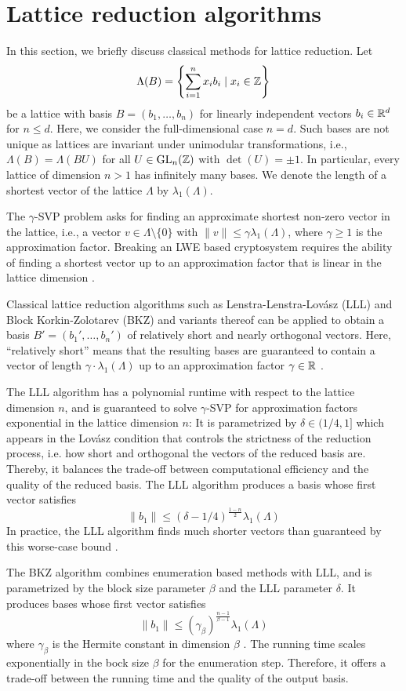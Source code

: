 \section{Lattice reduction algorithms}

In this section, we briefly discuss classical methods for lattice reduction. Let $$\Lambda(B)=\left\{\sum_{i=1}^nx_ib_i\mid x_i\in\mathbb Z\right\}$$ be a lattice with basis $B=(b_1,\dotsc,b_n)$ for linearly independent vectors $b_i\in\mathbb R^d$ for $n\leq d$. Here, we consider the full-dimensional case $n=d$. Such bases are not unique as lattices are invariant under unimodular transformations, i.e., $\Lambda(B)=\Lambda(BU)$ for all $U\in\mathrm{GL}_n(\mathbb Z)$ with $\det(U)=\pm1$. In particular, every lattice of dimension $n>1$ has infinitely many bases. We denote the length of a shortest vector of the lattice $\Lambda$ by $\lambda_1(\Lambda)$.

The $\gamma$-SVP problem asks for finding an approximate shortest non-zero vector in the lattice, i.e., a vector $v\in\Lambda\setminus\{0\}$ with $\|v\|\leq\gamma\lambda_1(\Lambda)$, where $\gamma\geq1$ is the approximation factor. Breaking an LWE based cryptosystem requires the ability of finding a shortest vector up to an approximation factor that is linear in the lattice dimension \cite{Peikert16}. 

Classical lattice reduction algorithms such as Lenstra-Lenstra-Lovász (LLL) \cite{LLL82} and Block Korkin-Zolotarev (BKZ) \cite{Schnorr94} and variants thereof can be applied to obtain a basis $B'=(b_1',\dotsc,b_n')$ of relatively short and nearly orthogonal vectors. Here, ``relatively short'' means that the resulting bases are guaranteed to contain a vector of length $\gamma\cdot\lambda_1(\Lambda)$ up to an approximation factor $\gamma\in\mathbb R$ \cite{Schneider10}.

The LLL algorithm \cite{LLL82} has a polynomial runtime with respect to the lattice dimension $n$, and is guaranteed to solve $\gamma$-SVP for approximation factors exponential in the lattice dimension $n$: It is parametrized by $\delta\in(1/4,1]$ which appears in the Lovász condition that controls the strictness of the reduction process, i.e. how short and orthogonal the vectors of the reduced basis are. Thereby, it balances the trade-off between computational efficiency and the quality of the reduced basis.
The LLL algorithm produces a basis whose first vector satisfies
$$ \|b_1\|\leq (\delta-1/4)^{\frac{1-n}{2}}\lambda_1(\Lambda) $$
In practice, the LLL algorithm finds much shorter vectors than guaranteed by this worse-case bound \cite{Schnorr94}.

The BKZ algorithm \cite{Schnorr94} combines enumeration based methods with LLL, and is parametrized by the block size parameter $\beta$ and the LLL parameter $\delta$. It produces bases whose first vector satisfies 
$$ \|b_1\|\leq (\gamma_{\beta})^{\frac{n-1}{\beta-1}}\lambda_1(\Lambda) $$
where $\gamma_{\beta}$ is the Hermite constant in dimension $\beta$ \cite{Schnorr94}.
The running time scales exponentially in the bock size $\beta$ for the enumeration step.
Therefore, it offers a trade-off between the running time and the quality of the output basis.



